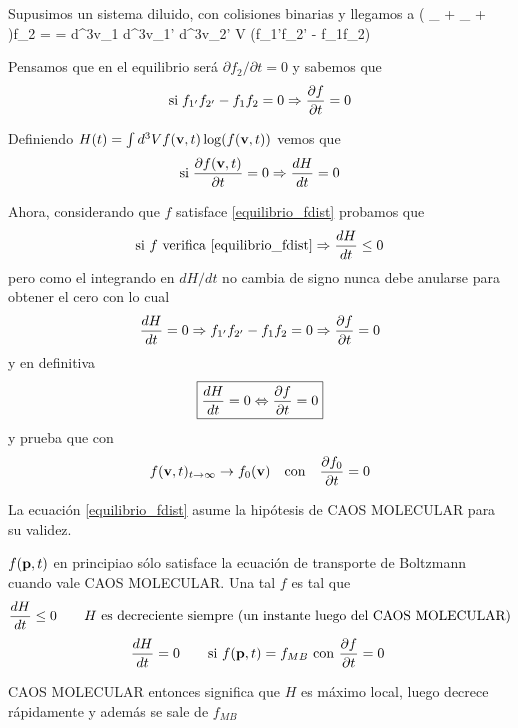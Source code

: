 \documentclass[10pt,oneside]{CBFT_book}
\begin{document}
Supusimos un sistema diluido, con colisiones binarias y llegamos a
\be
	\left( \cdot\nabla_{} + \cdot\nabla_{} +  \right)f_2 =
	 = \int\int\int d^3v_1 d^3v_1' d^3v_2' V \sigma (f_{1'}f_{2'} - f_1f_2)
	\label{equilibrio_fdist}
\ee

Pensamos que en el equilibrio será $\partial f_2 /\partial t = 0$ y sabemos que 
\[
	\text{si} \;  f_{1'}f_{2'} - f_1f_2 = 0  \Rightarrow  \frac{\partial^{\hspace{-0.05em}} {f}}{\partial {t}^{\hspace{-0.05em}}} = 0
\]

Definiendo $H(t) = \int d^3V f(\vb{v},t) \log( f(\vb{v},t) )$ vemos que 
\[
	\text{si} \; \dpar{f(\vb{v},t)}{t} = 0 \Rightarrow \dtot{H}{t} = 0
\]

Ahora, considerando que $f$ satisface \eqref{equilibrio_fdist} probamos que 
\[
	\text{si $f$ verifica \eqref{equilibrio_fdist}}  \Rightarrow \frac{d^{\hspace{-0.05em}} {H}}{d {t}^{\hspace{-0.05em}}} \leq 0
\]
pero como el integrando en $dH/dt$ no cambia de signo nunca debe anularse para obtener el cero
con lo cual 
\[
	\frac{d^{\hspace{-0.05em}} {H}}{d {t}^{\hspace{-0.05em}}} = 0 \Rightarrow f_{1'}f_{2'} - f_1f_2 = 0 \Rightarrow \frac{\partial^{\hspace{-0.05em}} {f}}{\partial {t}^{\hspace{-0.05em}}} = 0
\]
y en definitiva
\[
	\boxed{ \frac{d^{\hspace{-0.05em}} {H}}{d {t}^{\hspace{-0.05em}}} = 0 \Leftrightarrow  \frac{\partial^{\hspace{-0.05em}} {f}}{\partial {t}^{\hspace{-0.05em}}} = 0 }
\]
y prueba que con 
\[
	f(\vb{v},t)_{t\to \infty} \to f_0(\vb{v}) \quad \text{con} \quad \dpar{f_0}{t} = 0
\]

La ecuación \eqref{equilibrio_fdist} asume la hipótesis de CAOS MOLECULAR para su validez.

$f(\vb{p},t)$ en principiao sólo satisface la ecuación de transporte de Boltzmann cuando vale
CAOS MOLECULAR. Una tal $f$ es tal que 
\[
	\frac{d^{\hspace{-0.05em}} {H}}{d {t}^{\hspace{-0.05em}}} \leq 0 \qquad \text{$H$ es decreciente siempre (un instante luego del CAOS MOLECULAR)}
\]
\[
	\dtot{H}{t} = 0 \qquad \text{si $f(\vb{p},t) = f_{MB}$ con $\dpar{f}{t} = 0$ }
\]

CAOS MOLECULAR entonces significa que $H$ es máximo local, luego decrece rápidamente y además se sale
de $f_{MB}$




\end{document}
